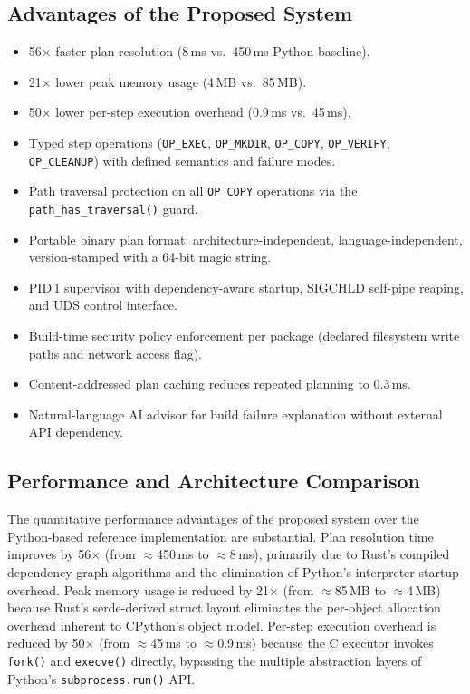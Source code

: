 \documentclass[12pt,a4paper]{report}
\begin{document}
\subsection{Advantages of the Proposed System}
\begin{itemize}[leftmargin=2em, itemsep=2pt]
  \item 56$\times$ faster plan resolution (8\,ms vs.\ 450\,ms Python baseline).
  \item 21$\times$ lower peak memory usage (4\,MB vs.\ 85\,MB).
  \item 50$\times$ lower per-step execution overhead (0.9\,ms vs.\ 45\,ms).
  \item Typed step operations (\texttt{OP\_EXEC}, \texttt{OP\_MKDIR},
        \texttt{OP\_COPY}, \texttt{OP\_VERIFY}, \texttt{OP\_CLEANUP}) with defined
        semantics and failure modes.
  \item Path traversal protection on all \texttt{OP\_COPY} operations via the
        \texttt{path\_has\_traversal()} guard.
  \item Portable binary plan format: architecture-independent, language-independent,
        version-stamped with a 64-bit magic string.
  \item PID\,1 supervisor with dependency-aware startup, SIGCHLD self-pipe
        reaping, and UDS control interface.
  \item Build-time security policy enforcement per package (declared filesystem
        write paths and network access flag).
  \item Content-addressed plan caching reduces repeated planning to 0.3\,ms.
  \item Natural-language AI advisor for build failure explanation without external
        API dependency.
\end{itemize}

\subsection{Performance and Architecture Comparison}

The quantitative performance advantages of the proposed system over the Python-based
reference implementation are substantial. Plan resolution time improves by 56$\times$
(from $\approx$450\,ms to $\approx$8\,ms), primarily due to Rust's compiled
dependency graph algorithms and the elimination of Python's interpreter startup
overhead. Peak memory usage is reduced by 21$\times$ (from $\approx$85\,MB to
$\approx$4\,MB) because Rust's serde-derived struct layout eliminates the per-object
allocation overhead inherent to CPython's object model. Per-step execution overhead
is reduced by 50$\times$ (from $\approx$45\,ms to $\approx$0.9\,ms) because the C
executor invokes \texttt{fork()} and \texttt{execve()} directly, bypassing the
multiple abstraction layers of Python's \texttt{subprocess.run()} API.
\end{document}
